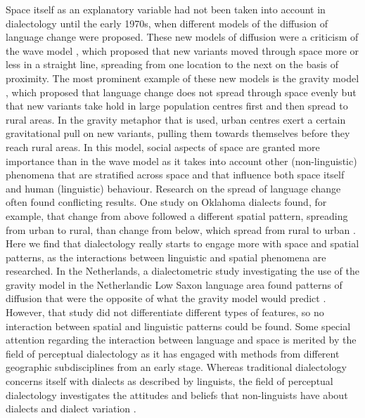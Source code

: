 \documentclass[output=paper,colorlinks,citecolor=brown,draft]{langscibook}
\begin{document}
Space itself as an explanatory variable had not been taken into account in dialectology until the early 1970s, when different models of the diffusion of language change were proposed. These new models of diffusion were a criticism of the wave model \citep{bailey_variation_1973}, which proposed that new variants moved through space more or less in a straight line, spreading from one location to the next on the basis of proximity. The most prominent example of these new models is the gravity model \citep{trudgill_linguistic_1974}, which proposed that language change does not spread through space evenly but that new variants take hold in large population centres first and then spread to rural areas. In the gravity metaphor that is used, urban centres exert a certain gravitational pull on new variants, pulling them towards themselves before they reach rural areas. In this model, social aspects of space are granted more importance than in the wave model as it takes into account other (non-linguistic) phenomena that are stratified across space and that influence both space itself and human (linguistic) behaviour. Research on the spread of language change often found conflicting results. One study on Oklahoma dialects found, for example, that change from above followed a different spatial pattern, spreading from urban to rural, than change from below, which spread from rural to urban \citep{bailey_variation_1973, labov_mechanisms_1965}. Here we find that dialectology really starts to engage more with space and spatial patterns, as the interactions between linguistic and spatial phenomena are researched. In the Netherlands, a dialectometric study investigating the use of the gravity model in the Netherlandic Low Saxon language area found patterns of diffusion that were the opposite of what the gravity model would predict \citep{nerbonne_dialectometric_2005}. However, that study did not differentiate different types of features, so no interaction between spatial and linguistic patterns could be found. 
\newpage
Some special attention regarding the interaction between language and space is merited by the field of perceptual dialectology as it has engaged with methods from different geographic subdisciplines from an early stage. Whereas traditional dialectology concerns itself with dialects as described by linguists, the field of perceptual dialectology investigates the attitudes and beliefs that non-linguists have about dialects and dialect variation \citep{preston_handbook_1999}. 
\end{document}
